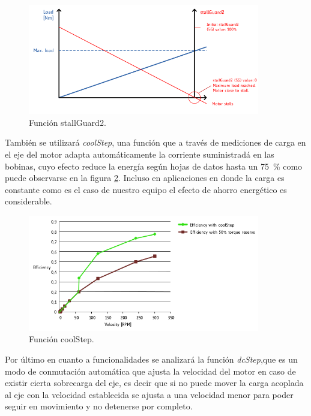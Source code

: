 \begin{figure}[h]
\centering 
\includegraphics[width=0.9\textwidth]{./Figures/tmc5130_stallguard2.png}
\caption{Función stallGuard2.}
\label{fig:tmc5130_stallGuard2}
\end{figure}

También se utilizará \textit{coolStep}, una función que a través de mediciones de carga en el eje del motor adapta automáticamente la corriente suministradá en las bobinas, cuyo efecto reduce la energía según hojas de datos hasta un \SI{75}{\percent} como puede observarse en la figura \ref{fig:tmc5130_coolStep}. Incluso en aplicaciones en donde la carga es constante como es el caso de nuestro equipo el efecto de ahorro energético es considerable.

\begin{figure}[h]
\centering 
\includegraphics[width=0.9\textwidth]{./Figures/tmc5130_coolstep.png}
\caption{Función coolStep.}
\label{fig:tmc5130_coolStep}
\end{figure}

Por último en cuanto a funcionalidades se analizará la función \textit{dcStep},que es un modo de conmutación automática que ajusta la velocidad del motor en caso de existir cierta sobrecarga del eje, es decir que si no puede mover la carga acoplada al eje con la velocidad establecida se ajusta a una velocidad menor para poder seguir en movimiento y no detenerse por completo. 


